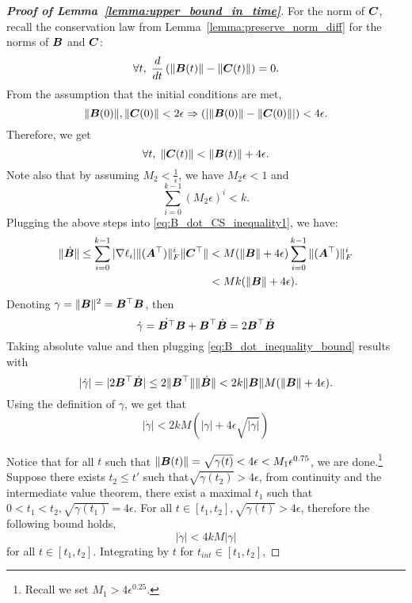 \begin{proof}[\textbf{Proof of Lemma~\ref{lemma:upper_bound_in_time}}]
For the norm of ${\bm{C}}$, recall the conservation law from Lemma~\ref{lemma:preserve_norm_diff} for the norms of ${\bm{B}}$ and ${\bm{C}}$:
\begin{equation}
    \forall t,\; \frac{d}{dt}\left(\left\|{\bm{B}}(t)\right\|-\left\|{\bm{C}}(t)\right\|\right) = 0.
\end{equation}
%
From the assumption that the initial conditions are met,
\begin{equation}
    \|{\bm{B}}(0)\|, \|{\bm{C}}(0)\| < 2 \epsilon \Rightarrow (|\|{\bm{B}}(0)\|-\|{\bm{C}}(0)\||) < 4 \epsilon.
\end{equation}
Therefore, we get
\begin{equation}
    \forall t,\; \|{\bm{C}}(t)\| < \|{\bm{B}}(t)\|+4 \epsilon.
\end{equation}
Note also that by assuming $M_2 <\frac{1}{\epsilon}$, we have $M_2\epsilon<1$ and
\begin{equation}
    \sum_{i=0}^{k-1}(M_2\epsilon)^i< k.
\end{equation}
Plugging the above steps into \eqref{eq:B_dot_CS_inequality1}, we have:
\begin{align}
\label{eq:B_dot_inequality_bound}
    \|\dot{{\bm{B}}}\| \leq  \sum_{i=0}^{k-1} |\nabla \ell_i| \|({\bm{A}}^\top)\|_F^i \|{\bm{C}}^\top\| &< M (\|{\bm{B}}\|+4 \epsilon) \sum_{i=0}^{k-1} \|({\bm{A}}^\top)\|_F^i \\
    &< Mk (\|{\bm{B}}\|+4 \epsilon).
\end{align}
Denoting $\gamma = \|{\bm{B}}\|^2 = {\bm{B}}^\top {\bm{B}}$, then
\begin{equation}
    \dot{\gamma} = \dot{{\bm{B}}^\top}{\bm{B}} + {\bm{B}}^\top\dot{{\bm{B}}} = 2{\bm{B}}^\top\dot{{\bm{B}}}
\end{equation}
%
Taking absolute value and then plugging \eqref{eq:B_dot_inequality_bound} results with %
\begin{equation}
    |\dot{\gamma}| = |2{\bm{B}}^\top\dot{{\bm{B}}}| \leq 2 \|{\bm{B}}^\top\| \|\dot{{\bm{B}}}\| < 2k \|{\bm{B}}\| M (\|{\bm{B}}\|+4 \epsilon).
\end{equation}
Using the definition of $\gamma$, we get that
\begin{equation}
    |\dot{\gamma}| < 2k M \left(|\gamma|+4 \epsilon \sqrt{|\gamma|}\right)
\end{equation}

Notice that for all $t$ such that $\|{\bm{B}}(t)\| = \sqrt{\gamma(t)}<4 \epsilon<M_1 \epsilon^{0.75}$, we are done.\footnote{Recall we set $M_1>4\epsilon^{0.25}$.} Suppose there exists $t_2\le t'$ such that$\sqrt{\gamma(t_2)}>4 \epsilon$, from continuity and the intermediate value theorem, there exist a maximal $t_1$ such that $0 < t_1<t_2, \sqrt{\gamma(t_1)}= 4 \epsilon$. For all $t\in[t_1,t_2], \sqrt{\gamma(t)}>4 \epsilon$, therefore the following bound holds,
\begin{equation}
    |\dot{\gamma}| < 4k M |\gamma|
\end{equation}
for all $t\in[t_1,t_2]$.
%
Integrating by $t$ for $t_{int}\in [t_1,t_2]$,


\end{proof}
